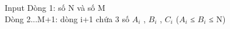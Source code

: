 Input
Dòng 1: số N và số M   
\\   Dòng 2...M+1: dòng i+1 chứa 3 số $A_{i}$   , $B_{i}$   , $C_{i}$   ($A_{i}$   ≤ $B_{i}$   ≤ N)